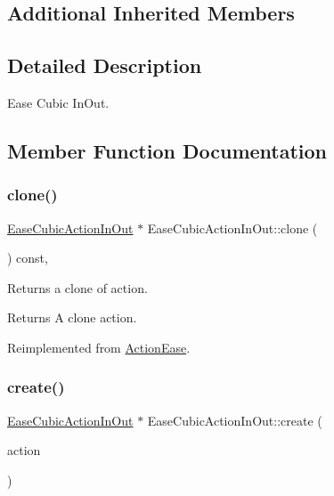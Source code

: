 \subsection*{Additional Inherited Members}


\subsection{Detailed Description}
Ease Cubic In\+Out. 

\subsection{Member Function Documentation}
\mbox{\label{classEaseCubicActionInOut_a763cbeffe3a66602e1524b5ec68341ad}} 
\subsubsection{\texorpdfstring{clone()}{clone()}}
{\footnotesize\ttfamily \hyperlink{classEaseCubicActionInOut}{Ease\+Cubic\+Action\+In\+Out} $\ast$ Ease\+Cubic\+Action\+In\+Out\+::clone (\begin{DoxyParamCaption}\item[{void}]{ }\end{DoxyParamCaption}) const\hspace{0.3cm}{\ttfamily [override]}, {\ttfamily [virtual]}}

Returns a clone of action.

\begin{DoxyReturn}{Returns}
A clone action. 
\end{DoxyReturn}


Reimplemented from \hyperlink{classActionEase_a39bec93fe161fb732a74d8e51a2fe08b}{Action\+Ease}.

\mbox{\label{classEaseCubicActionInOut_a5069b705bf5fc3a58e37726e7202db02}} 
\subsubsection{\texorpdfstring{create()}{create()}}
{\footnotesize\ttfamily \hyperlink{classEaseCubicActionInOut}{Ease\+Cubic\+Action\+In\+Out} $\ast$ Ease\+Cubic\+Action\+In\+Out\+::create (\begin{DoxyParamCaption}\item[{\hyperlink{classActionInterval}{Action\+Interval} $\ast$}]{action }\end{DoxyParamCaption})\hspace{0.3cm}{\ttfamily [static]}}



